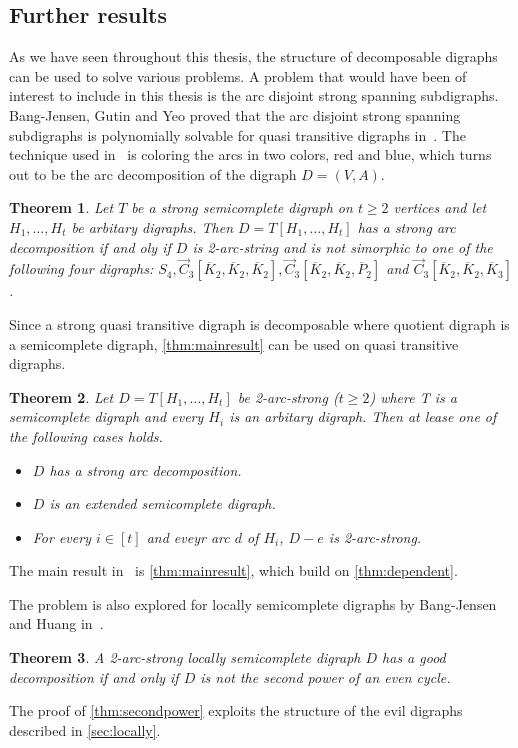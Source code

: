 \documentclass[11pt,oneside,a4paper]{report}
\newtheorem{thm}{Theorem}[section]
\begin{document}
	\subsection{Further results}
	As we have seen throughout this thesis, the structure of decomposable digraphs can be used to solve various problems.
	A problem that would have been of interest to include in this thesis is the arc disjoint strong spanning subdigraphs.
	Bang-Jensen, Gutin and Yeo proved that the arc disjoint strong spanning subdigraphs is polynomially solvable for quasi transitive digraphs in~\cite{bangJGT95}.
	The technique used in~\cite{bangJGT95} is coloring the arcs in two colors, red and blue, which turns out to be the arc decomposition of the digraph $D = (V,A)$.
	\begin{thm}\label{thm:mainresult}
		Let $T$ be a strong semicomplete digraph on $t \geq 2$ vertices and let $H_1, \dots ,H_t$ be arbitary digraphs.
		Then $D = T[H_1, \dots, H_t]$ has a strong arc decomposition if and oly if $D$ is 2-arc-string and is not simorphic to one of the following four digraphs: $S_4,\overrightarrow{C}_3[\overline{K}_2,\overline{K}_2,\overline{K}_2],\overrightarrow{C}_3[\overline{K}_2,\overline{K}_2,\overline{P}_2]$ and $\overrightarrow{C}_3[\overline{K}_2,\overline{K}_2,\overline{K}_3]$.
	\end{thm}
	Since a strong quasi transitive digraph is decomposable where quotient digraph is a semicomplete digraph, \autoref{thm:mainresult} can be used on quasi transitive digraphs.
	\begin{thm}\label{thm:dependent}
		Let $D = T[H_1, \dots, H_t]$ be 2-arc-strong ($t \geq 2$) where T is a semicomplete digraph and every $H_i$ is an arbitary digraph. Then at lease one of the following cases holds.
		\begin{itemize}
			\item[(a)] $D$ has a strong arc decomposition.
			\item[(b)] $D$ is an extended semicomplete digraph.
			\item[(c)] For every $i \in [t]$ and eveyr arc $d$ of $H_i$, $D - e$ is 2-arc-strong.
		\end{itemize}
	\end{thm}
	The main result in~\cite{bangJGT95} is \autoref{thm:mainresult}, which build on \autoref{thm:dependent}.

	The problem is also explored for locally semicomplete digraphs by Bang-Jensen and Huang in~\cite{bangJCT102}.
	\begin{thm}\label{thm:secondpower}
		A 2-arc-strong locally semicomplete digraph $D$ has a good decomposition if and only if $D$ is not the second power of an even cycle.
	\end{thm}
	The proof of \autoref{thm:secondpower} exploits the structure of the evil digraphs described in \autoref{sec:locally}.


\end{document}
